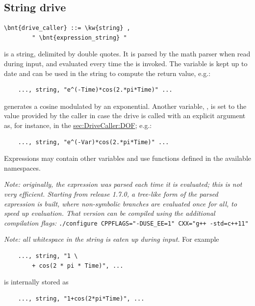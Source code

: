 \subsection{String drive}
\begin{Verbatim}[commandchars=\\\{\}]
    \bnt{drive_caller} ::= \kw{string} ,
        " \bnt{expression_string} "
\end{Verbatim}
 is a string, delimited by double quotes.
It is parsed by the math parser when read during input, and evaluated every time 
the  is invoked.
The variable  is kept up to date and can be used in the 
string to compute the return value, e.g.:
\begin{verbatim}
    ..., string, "e^(-Time)*cos(2.*pi*Time)" ...
\end{verbatim}
generates a cosine modulated by an exponential.
Another variable, , is set to the value provided by the caller
in case the drive is called with an explicit argument as, for instance,
in the \hyperref{\kw{dof drive}}{\kw{dof drive} (see Section~}{)}{sec:DriveCaller:DOF};
e.g.:
\begin{verbatim}
    ..., string, "e^(-Var)*cos(2.*pi*Time)" ...
\end{verbatim}
Expressions may contain other variables and use functions defined in the available namespaces.

\emph{Note: originally, the expression was parsed each time it is evaluated;
this is not very efficient.
Starting from release 1.7.0, a tree-like form of the
parsed expression is built, where non-symbolic branches are evaluated once for all,
to speed up evaluation. That version can be compiled using the additional compilation flags:} \verb;./configure CPPFLAGS="-DUSE_EE=1" CXX="g++ -std=c++11";

\emph{Note: all whitespace in the string is eaten up during input.}
For example
\begin{verbatim}
    ..., string, "1 \
        + cos(2 * pi * Time)", ...
\end{verbatim}
is internally stored as
\begin{verbatim}
    ..., string, "1+cos(2*pi*Time)", ...
\end{verbatim}


